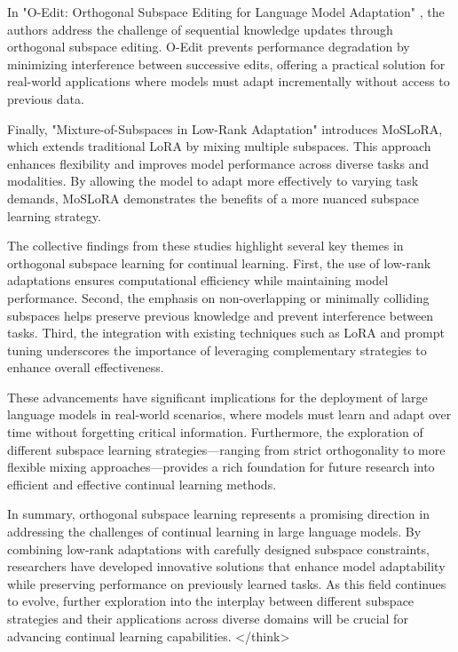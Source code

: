 \documentclass[conference]{IEEEtran}
\begin{document}
In "O-Edit: Orthogonal Subspace Editing for Language Model Adaptation" \cite{bX}, the authors address the challenge of sequential knowledge updates through orthogonal subspace editing. O-Edit prevents performance degradation by minimizing interference between successive edits, offering a practical solution for real-world applications where models must adapt incrementally without access to previous data.

Finally, "Mixture-of-Subspaces in Low-Rank Adaptation" \cite{bX} introduces MoSLoRA, which extends traditional LoRA by mixing multiple subspaces. This approach enhances flexibility and improves model performance across diverse tasks and modalities. By allowing the model to adapt more effectively to varying task demands, MoSLoRA demonstrates the benefits of a more nuanced subspace learning strategy.

The collective findings from these studies highlight several key themes in orthogonal subspace learning for continual learning. First, the use of low-rank adaptations ensures computational efficiency while maintaining model performance. Second, the emphasis on non-overlapping or minimally colliding subspaces helps preserve previous knowledge and prevent interference between tasks. Third, the integration with existing techniques such as LoRA and prompt tuning underscores the importance of leveraging complementary strategies to enhance overall effectiveness.

These advancements have significant implications for the deployment of large language models in real-world scenarios, where models must learn and adapt over time without forgetting critical information. Furthermore, the exploration of different subspace learning strategies—ranging from strict orthogonality to more flexible mixing approaches—provides a rich foundation for future research into efficient and effective continual learning methods.

In summary, orthogonal subspace learning represents a promising direction in addressing the challenges of continual learning in large language models. By combining low-rank adaptations with carefully designed subspace constraints, researchers have developed innovative solutions that enhance model adaptability while preserving performance on previously learned tasks. As this field continues to evolve, further exploration into the interplay between different subspace strategies and their applications across diverse domains will be crucial for advancing continual learning capabilities.
</think>
\end{document}
